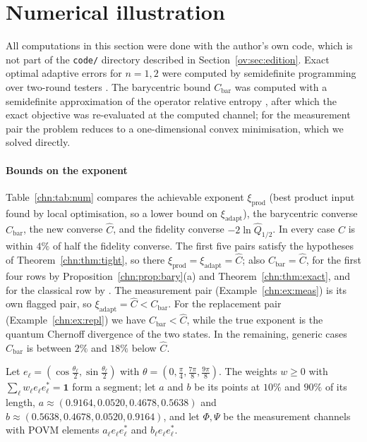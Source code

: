 \section{Numerical illustration}\label{chn:sec:num}

All computations in this section were done with the author's own code, which is not part of the \texttt{code/} directory described in Section~\ref{ov:sec:edition}. Exact optimal adaptive errors for $n=1,2$ were computed by semidefinite programming over two-round testers \cite{GutoskiWatrous2007,ChiribellaDArianoPerinotti2009}. The barycentric bound $C_{\mathrm{bar}}$ was computed with a semidefinite approximation of the operator relative entropy \cite{FawziSaundersParrilo2019}, after which the exact objective was re-evaluated at the computed channel; for the measurement pair the problem reduces to a one-dimensional convex minimisation, which we solved directly.

\paragraph{Bounds on the exponent} Table~\ref{chn:tab:num} compares the achievable exponent $\xi_{\mathrm{prod}}$ (best product input found by local optimisation, so a lower bound on $\xi_{\mathrm{adapt}}$), the barycentric converse $C_{\mathrm{bar}}$, the new converse $\widehat C$, and the fidelity converse $-2\ln\widehat Q_{1/2}$. In every case $\widehat C$ is within $4\%$ of half the fidelity converse. The first five pairs satisfy the hypotheses of Theorem~\ref{chn:thm:tight}, so there $\xi_{\mathrm{prod}}=\xi_{\mathrm{adapt}}=\widehat C$; also $C_{\mathrm{bar}}=\widehat C$, for the first four rows by Proposition~\ref{chn:prop:bary}(a) and Theorem~\ref{chn:thm:exact}, and for the classical row by \cite{JMMW2024}. The measurement pair (Example~\ref{chn:ex:meas}) is its own flagged pair, so $\xi_{\mathrm{adapt}}=\widehat C<C_{\mathrm{bar}}$. For the replacement pair (Example~\ref{chn:ex:repl}) we have $C_{\mathrm{bar}}<\widehat C$, while the true exponent is the quantum Chernoff divergence of the two states. In the remaining, generic cases $C_{\mathrm{bar}}$ is between $2\%$ and $18\%$ below $\widehat C$.

\begin{example}\label{chn:ex:meas}
Let $e_\ell=(\cos\frac{\theta_\ell}2,\sin\frac{\theta_\ell}2)$ with $\theta=(0,\frac\pi4,\frac{7\pi}8,\frac{9\pi}8)$. The weights $w\ge0$ with $\sum_\ell w_\ell e_\ell e_\ell^*=\mathbf 1$ form a segment; let $a$ and $b$ be its points at $10\%$ and $90\%$ of its length, $a\approx(0.9164,0.0520,0.4678,0.5638)$ and $b\approx(0.5638,0.4678,0.0520,0.9164)$, and let $\Phi,\Psi$ be the measurement channels with POVM elements $a_\ell e_\ell e_\ell^*$ and $b_\ell e_\ell e_\ell^*$.
\end{example}

